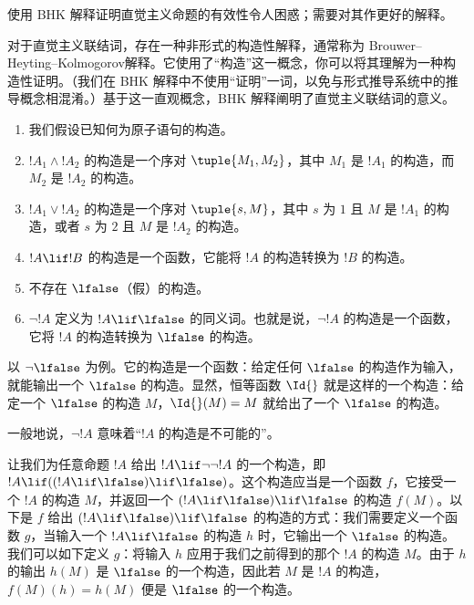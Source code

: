 \documentclass[../../../include/open-logic-section]{subfiles}
\begin{document}


\begin{editorial}
  使用 BHK 解释证明直觉主义命题的有效性令人困惑；需要对其作更好的解释。
\end{editorial}

对于直觉主义联结词，存在一种非形式的构造性解释，通常称为 Brouwer--Heyting--Kolmogorov解释。它使用了“构造”这一概念，你可以将其理解为一种构造性证明。（我们在 BHK 解释中不使用“证明”一词，以免与形式推导系统中的推导概念相混淆。）基于这一直观概念，BHK 解释阐明了直觉主义联结词的意义。

\begin{enumerate}
\item 我们假设已知何为原子语句的构造。
\item $!A_1 \land !A_2$ 的构造是一个序对 $\tuple{M_1, M_2}$，其中 $M_1$ 是 $!A_1$ 的构造，而 $M_2$ 是 $!A_2$ 的构造。
\item $!A_1 \lor !A_2$ 的构造是一个序对 $\tuple{s, M}$，其中 $s$ 为 $1$ 且 $M$ 是 $!A_1$ 的构造，或者 $s$ 为 $2$ 且 $M$ 是 $!A_2$ 的构造。
\item $!A \lif !B$ 的构造是一个函数，它能将 $!A$ 的构造转换为 $!B$ 的构造。
\item 不存在 $\lfalse$（假）的构造。
\item $\lnot !A$ 定义为 $!A \lif \lfalse$ 的同义词。也就是说，$\lnot !A$ 的构造是一个函数，它将 $!A$ 的构造转换为 $\lfalse$ 的构造。
\end{enumerate}

\begin{ex}
以 $\lnot \lfalse$ 为例。它的构造是一个函数：给定任何 $\lfalse$ 的构造作为输入，就能输出一个 $\lfalse$ 的构造。显然，恒等函数 $\Id{}$ 就是这样的一个构造：给定一个 $\lfalse$ 的构造 $M$，$\Id{}(M) = M$ 就给出了一个 $\lfalse$ 的构造。
\end{ex}

一般地说，$\lnot !A$ 意味着“$!A$ 的构造是不可能的”。

\begin{ex}
让我们为任意命题 $!A$ 给出 $!A \lif \lnot \lnot !A$ 的一个构造，即 $!A \lif ((!A \lif \lfalse) \lif \lfalse)$。这个构造应当是一个函数 $f$，它接受一个 $!A$ 的构造 $M$，并返回一个 $(!A \lif \lfalse) \lif \lfalse$ 的构造 $f(M)$。以下是 $f$ 给出 $(!A \lif \lfalse) \lif \lfalse$ 的构造的方式：我们需要定义一个函数 $g$，当输入一个 $!A \lif \lfalse$ 的构造 $h$ 时，它输出一个 $\lfalse$ 的构造。我们可以如下定义 $g$：将输入 $h$ 应用于我们之前得到的那个 $!A$ 的构造 $M$。由于 $h$ 的输出 $h(M)$ 是 $\lfalse$ 的一个构造，因此若 $M$ 是 $!A$ 的构造，$f(M)(h) = h(M)$ 便是 $\lfalse$ 的一个构造。
\end{ex}
\end{document}
